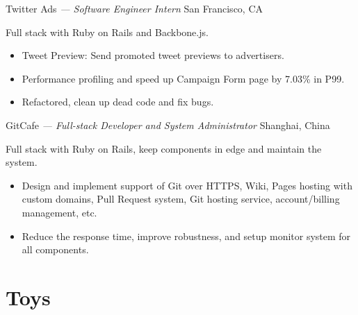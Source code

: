 \documentclass[]{friggeri-cv} %
\begin{document}
  \begin{entrylist}
  {Twitter Ads \emph{--- Software Engineer Intern}}
  {San Francisco, CA}
  {
    Full stack with Ruby on Rails and Backbone.js.\@
    \begin{itemize}
      \item Tweet Preview: Send promoted tweet previews to advertisers.
      \item Performance profiling and speed up Campaign Form page by 7.03\% in P99.
      \item Refactored, clean up dead code and fix bugs.
    \end{itemize}
  }
  {GitCafe \emph{--- Full-stack Developer and System Administrator}}
  {Shanghai, China}
  {
    Full stack with Ruby on Rails, keep components in edge and maintain the system.\@
    \begin{itemize}
    \item Design and implement support of Git over HTTPS, Wiki, Pages hosting with custom domains,
    Pull Request system, Git hosting service, account/billing management, etc.
    \item Reduce the response time, improve robustness, and setup monitor system for all components.
    \end{itemize}
  }
\end{entrylist}


\section{Toys}
\end{document}
